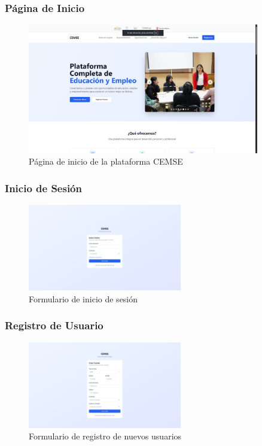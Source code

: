 \documentclass[12pt,a4paper]{article}
\begin{document}
\begin{enumerate}
\subsubsection{Página de Inicio}
\begin{figure}[H]
    \centering
    \includegraphics[width=0.9\textwidth]{screenshots/auth/landing-page.png}
    \caption{Página de inicio de la plataforma CEMSE}
    \label{fig:landing-page}
\end{figure}

\subsubsection{Inicio de Sesión}
\begin{figure}[H]
    \centering
    \includegraphics[width=0.6\textwidth]{screenshots/auth/sign-in.png}
    \caption{Formulario de inicio de sesión}
    \label{fig:sign-in}
\end{figure}

\subsubsection{Registro de Usuario}
\begin{figure}[H]
    \centering
    \includegraphics[width=0.6\textwidth]{screenshots/auth/sign-up.png}
    \caption{Formulario de registro de nuevos usuarios}
    \label{fig:sign-up}
\end{figure}


\end{enumerate}
\end{document}
